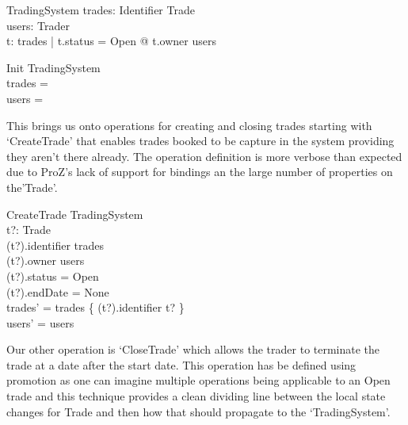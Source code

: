 \documentclass{article}
\begin{document}
\begin{schema}{TradingSystem}
trades: Identifier \pfun Trade \\
users: \power Trader \\
\where
\forall t: \ran trades | t.status = Open @ t.owner \in users \\ 
\end{schema}

\begin{schema}{Init}
TradingSystem \\
\where
trades = \emptyset \\
users = \emptyset \\
\end{schema}

\hspace{-0.7cm} This brings us onto operations for creating and closing trades starting with ‘CreateTrade’ that enables trades booked to be capture in the system providing they aren’t there already. The operation definition is more verbose than expected due to ProZ’s lack of support for bindings an the large number of properties on the’Trade’.

\begin{schema}{CreateTrade}
\Delta TradingSystem \\
t?: Trade \\
\where 
(t?).identifier \notin \dom trades \\
(t?).owner \in users \\
(t?).status = Open \\ 
(t?).endDate = None \\
trades' = trades \cup \{ (t?).identifier \mapsto t? \} \\
users' = users \\
\end{schema}

Our other operation is ‘CloseTrade’ which allows the trader to terminate the trade at a date after the start date. This operation has be defined using promotion as one can imagine multiple operations being applicable to an Open trade and this technique provides a clean dividing line between the local state changes for Trade and then how that should propagate to the ‘TradingSystem’.
\end{document}
